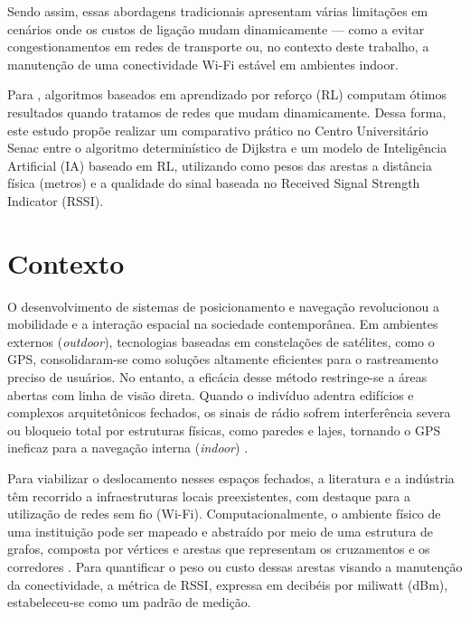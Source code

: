 \documentclass[
    12pt,                %
    openright,           %
    oneside,             %
    a4paper,             %
    english,             %
    brazil               %
]{abntex2}
\begin{document}
Sendo assim, essas abordagens tradicionais apresentam várias limitações 
em cenários onde os custos de ligação mudam dinamicamente --- como 
a evitar congestionamentos em redes de transporte \cite{Pham2025} 
ou, no contexto deste trabalho, a manutenção de uma conectividade Wi-Fi 
estável em ambientes indoor.

Para , algoritmos baseados em aprendizado por reforço (RL) computam ótimos resultados quando tratamos de redes que mudam dinamicamente. Dessa forma, este estudo propõe realizar um comparativo prático no Centro Universitário Senac entre o algoritmo determinístico de Dijkstra e um modelo de Inteligência Artificial (IA) baseado em RL, utilizando como pesos das arestas a distância física (metros) e a qualidade do sinal baseada no Received Signal Strength Indicator (RSSI).


\section{Contexto}
\label{sec:contexto}

O desenvolvimento de sistemas de posicionamento e navegação revolucionou a mobilidade e a interação espacial na sociedade contemporânea. Em ambientes externos (\textit{outdoor}), tecnologias baseadas em constelações de satélites, como o GPS, consolidaram-se como soluções altamente eficientes para o rastreamento preciso de usuários. No entanto, a eficácia desse método restringe-se a áreas abertas com linha de visão direta. Quando o indivíduo adentra edifícios e complexos arquitetônicos fechados, os sinais de rádio sofrem interferência severa ou bloqueio total por estruturas físicas, como paredes e lajes, tornando o GPS ineficaz para a navegação interna (\textit{indoor}) \cite{Chia2025, BarrosoBrito2025}.

Para viabilizar o deslocamento nesses espaços fechados, a literatura e a indústria têm recorrido a infraestruturas locais preexistentes, com destaque para a utilização de redes sem fio (Wi-Fi). Computacionalmente, o ambiente físico de uma instituição pode ser mapeado e abstraído por meio de uma estrutura de grafos, composta por vértices e arestas que representam os cruzamentos e os corredores \cite{Stancel2021}. Para quantificar o peso ou custo dessas arestas visando a manutenção da conectividade, a métrica de RSSI, expressa em decibéis por miliwatt (dBm), estabeleceu-se como um padrão de medição. 
\end{document}
